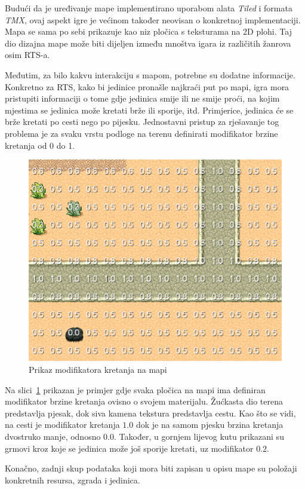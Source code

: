\documentclass[times, utf8, zavrsni, numeric]{fer}
\begin{document}
\par Budući da je uređivanje mape implementirano uporabom alata \textit{Tiled} i formata \textit{TMX}, ovaj aspekt igre je većinom također neovisan o konkretnoj implementaciji.
Mapa se sama po sebi prikazuje kao niz pločica s teksturama na 2D plohi.
Taj dio dizajna mape može biti dijeljen između mnoštva igara iz različitih žanrova osim RTS-a.

\par Međutim, za bilo kakvu interakciju s mapom, potrebne su dodatne informacije.
Konkretno za RTS, kako bi jedinice pronašle najkraći put po mapi, igra mora pristupiti informaciji o tome gdje jedinica smije ili ne smije proći, na kojim mjestima se jedinica može kretati brže ili sporije, itd.
Primjerice, jedinica će se brže kretati po cesti nego po pijesku.
Jednostavni pristup za rješavanje tog problema je za svaku vrstu podloge na  terenu definirati modifikator brzine kretanja od 0 do 1.

\begin{figure}[h]
	\centering
	\includegraphics[width=0.6\linewidth]{images/tileModifiers.png}
	\caption{Prikaz modifikatora kretanja na mapi}
	\label{fig:tileModifiers}
\end{figure}

\par Na slici~\ref{fig:tileModifiers} prikazan je primjer gdje svaka pločica na mapi ima definiran modifikator brzine kretanja ovisno o svojem materijalu.
Žućkasta dio terena predstavlja pjesak, dok siva kamena tekstura predstavlja cestu.
Kao što se vidi, na cesti je modifikator kretanja \(1.0\) dok je na samom pjesku brzina kretanja dvostruko manje, odnosno \(0.0\).
Također, u gornjem lijevog kutu prikazani su grmovi kroz koje se jedinica može još sporije kretati, uz modifikator \(0.2\).

\par Konačno, zadnji skup podataka koji mora biti zapisan u opisu mape su položaji konkretnih resursa, zgrada i jedinica.
\end{document}
